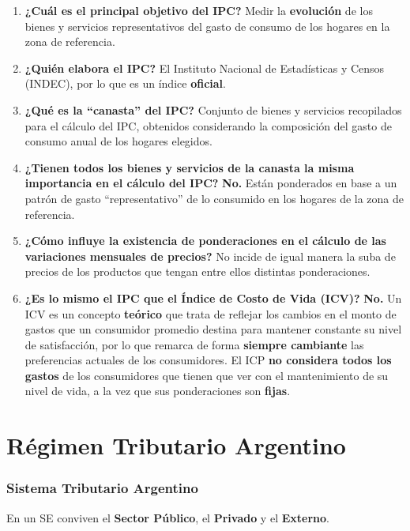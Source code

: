 \documentclass[10pt,a4paper]{article}
\begin{document}
\begin{enumerate}
\item \textbf{¿Cuál es el principal objetivo del IPC?}
\subitem Medir la \textbf{evolución} de los bienes y servicios representativos del gasto de consumo de los hogares en la zona de referencia.
\item \textbf{¿Quién elabora el IPC?}
\subitem El Instituto Nacional de Estadísticas y Censos (INDEC), por lo que es un índice \textbf{oficial}.
\item \textbf{¿Qué es la ``canasta'' del IPC?}
\subitem Conjunto de bienes y servicios recopilados para el cálculo del IPC, obtenidos considerando la composición del gasto de consumo anual de los hogares elegidos.
\item \textbf{¿Tienen todos los bienes y servicios de la canasta la misma importancia en el cálculo del IPC?}
\subitem \textbf{No.} Están ponderados en base a un patrón de gasto ``representativo'' de lo consumido en los hogares de la zona de referencia.
\item \textbf{¿Cómo influye la existencia de ponderaciones en el cálculo de las variaciones mensuales de precios?}
\subitem No incide de igual manera la suba de precios de los productos que tengan entre ellos distintas ponderaciones.
\item \textbf{¿Es lo mismo el IPC que el Índice de Costo de Vida (ICV)?}
\subitem \textbf{No.} Un ICV es un concepto \textbf{teórico} que trata de reflejar los cambios en el monto de gastos que un consumidor promedio destina para mantener constante su nivel de satisfacción, por lo que remarca de forma \textbf{siempre cambiante} las preferencias actuales de los consumidores. El ICP \textbf{no considera todos los gastos} de los consumidores que tienen que ver con el mantenimiento de su nivel de vida, a la vez que sus ponderaciones son \textbf{fijas}.
\end{enumerate}

\newpage

\part{Régimen Tributario Argentino}

\setcounter{section}{0}

\section{Sistema Tributario Argentino}

En un SE conviven el \textbf{Sector Público}, el \textbf{Privado} y el \textbf{Externo}.
\end{document}
